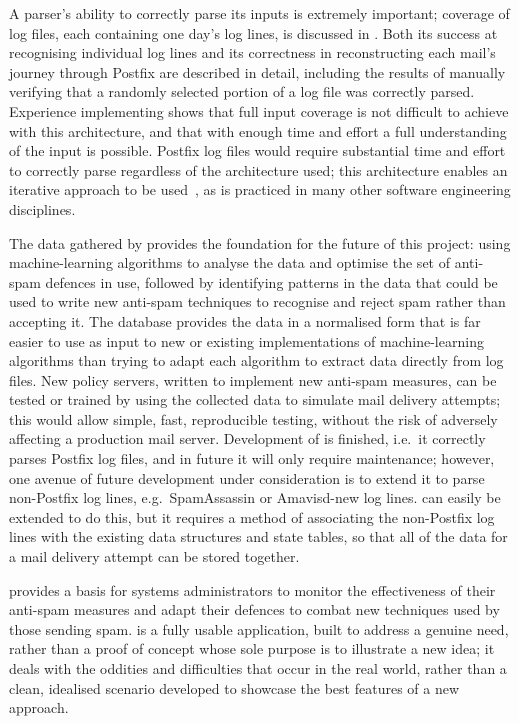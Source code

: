 A parser's ability to correctly parse its inputs is extremely important;
\parsernames{} coverage of \numberOFlogFILES{} log files, each containing
one day's log lines, is discussed in .  Both
its success at recognising individual log lines  and its correctness in
reconstructing each mail's journey through Postfix are described in detail,
including the results of manually verifying that a randomly selected
portion of a log file was correctly parsed.  Experience implementing
\parsername{} shows that full input coverage is not difficult to achieve
with this architecture, and that with enough time and effort a full
understanding of the input is possible.  Postfix log files would require
substantial time and effort to correctly parse regardless of the
architecture used; this architecture enables an iterative approach to be
used~\cite{stepwise-refinement}, as is practiced in many other software
engineering disciplines.

The data gathered by \parsername{} provides the foundation for the future
of this project: using machine-learning algorithms to analyse the data and
optimise the set of anti-spam defences in use, followed by identifying
patterns in the data that could be used to write new anti-spam techniques
to recognise and reject spam rather than accepting it.  The database
provides the data in a normalised form that is far easier to use as input
to new or existing implementations of machine-learning algorithms than
trying to adapt each algorithm to extract data directly from log files.
New policy servers, written to implement new anti-spam measures, can be
tested or trained by using the collected data to simulate mail delivery
attempts; this would allow simple, fast, reproducible testing, without the
risk of adversely affecting a production mail server.  Development of
\parsername{} is finished, i.e.\ it correctly parses Postfix log files, and
in future it will only require maintenance; however, one avenue of future
development under consideration is to extend it to parse non-Postfix log
lines, e.g.\ SpamAssassin or Amavisd-new log lines.  \parsername{} can
easily be extended to do this, but it requires a method of associating the
non-Postfix log lines with the existing data structures and state tables,
so that all of the data for a mail delivery attempt can be stored together.

\parsername{} provides a basis for systems administrators to monitor the
effectiveness of their anti-spam measures and adapt their defences to
combat new techniques used by those sending spam.  \parsername{} is a fully
usable application, built to address a genuine need, rather than a proof of
concept whose sole purpose is to illustrate a new idea; it deals with the
oddities and difficulties that occur in the real world, rather than a
clean, idealised scenario developed to showcase the best features of a new
approach.

